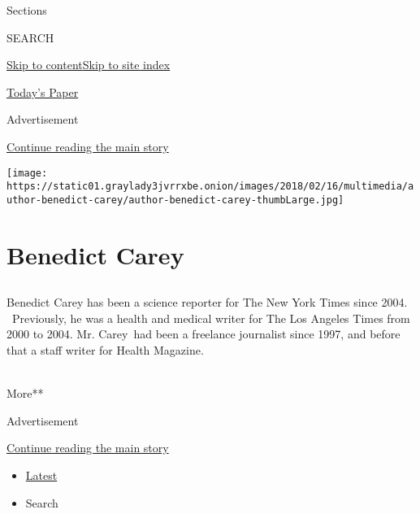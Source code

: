 Sections

SEARCH

\protect\hyperlink{site-content}{Skip to
content}\protect\hyperlink{site-index}{Skip to site index}

\href{https://myaccount.nytimes3xbfgragh.onion/auth/login?response_type=cookie\&client_id=vi}{}

\href{https://www.nytimes3xbfgragh.onion/section/todayspaper}{Today's
Paper}

Advertisement

\protect\hyperlink{after-top}{Continue reading the main story}

\texttt{[image: https://static01.graylady3jvrrxbe.onion/images/2018/02/16/multimedia/author-benedict-carey/author-benedict-carey-thumbLarge.jpg]}

\hypertarget{benedict-carey}{%
\section{Benedict Carey}\label{benedict-carey}}

\subsection{}

Benedict Carey has been a science reporter for The New York Times since
2004. ~Previously, he was a health and medical writer for The Los
Angeles Times from 2000 to 2004. Mr. Carey~had been a freelance
journalist since 1997, and before that a staff writer for Health
Magazine.~ ~ ~ ~ ~ ~ ~ ~ ~ ~ ~ ~ ~ ~ ~ ~ ~ ~ ~ ~ ~ ~ ~ ~ ~ ~ ~ ~ ~

More**

Advertisement

\protect\hyperlink{after-mid1}{Continue reading the main story}

\begin{itemize}
\tightlist
\item
  \protect\hyperlink{stream-panel}{Latest}
\item
  Search
\end{itemize}

